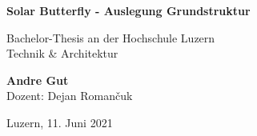 \begin{titlepage}
    \begin{center}
        \vspace*{1.5cm}

        \Huge
        \textbf{Solar Butterfly - Auslegung Grundstruktur}\\
        \vspace{1cm}

        \LARGE
        Bachelor-Thesis an der Hochschule Luzern\\
        Technik \& Architektur

        \Large
        \vspace{3cm}

        \LARGE
        \textbf{Andre Gut}\\
        Dozent: Dejan Roman\v{c}uk
        \vspace{1.5cm}


        \begin{center}
        \end{center}

        \vfill
        \large
        Luzern, 11. Juni 2021

    \end{center}
\end{titlepage}

